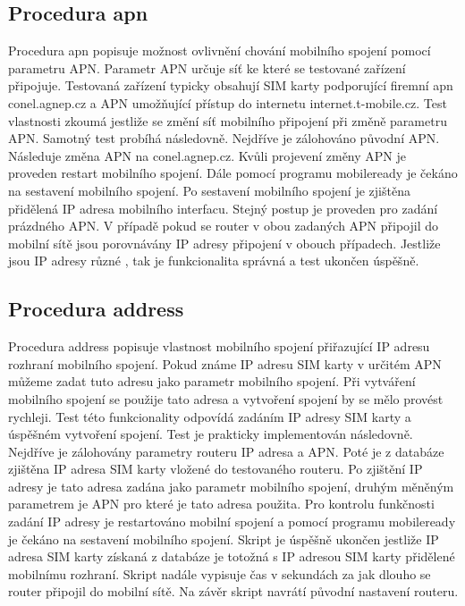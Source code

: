 \subsection{Procedura apn}
Procedura apn popisuje možnost ovlivnění chování mobilního spojení pomocí parametru APN. Parametr APN určuje síť ke které se testované zařízení připojuje. Testovaná zařízení typicky obsahují SIM karty podporující firemní apn conel.agnep.cz a APN umožňující přístup do internetu internet.t-mobile.cz. Test vlastnosti zkoumá jestliže se změní síť mobilního připojení při změně parametru APN. Samotný test probíhá následovně. Nejdříve je zálohováno původní APN. Následuje změna APN na conel.agnep.cz. Kvůli projevení změny APN je proveden restart mobilního spojení. Dále pomocí programu mobileready je čekáno na sestavení mobilního spojení. Po sestavení mobilního spojení je zjištěna přidělená IP adresa mobilního interfacu. Stejný postup je proveden pro zadání prázdného APN. V případě pokud se router v obou zadaných APN připojil do mobilní sítě jsou porovnávány IP adresy připojení v obouch případech. Jestliže jsou IP adresy různé , tak je funkcionalita správná a test ukončen úspěšně.

\subsection{Procedura address}
Procedura address popisuje vlastnost mobilního spojení přiřazující IP adresu rozhraní mobilního spojení. Pokud známe IP adresu SIM karty v určitém APN můžeme zadat tuto adresu jako parametr mobilního spojení. Při vytváření mobilního spojení se použije tato adresa a vytvoření spojení by se mělo provést rychleji. Test této funkcionality odpovídá zadáním IP adresy SIM karty a úspěšném vytvoření spojení. Test je prakticky implementován následovně. Nejdříve je zálohovány parametry routeru IP adresa a APN. Poté je z databáze zjištěna IP adresa SIM karty vložené do testovaného routeru. Po zjištění IP adresy je tato adresa zadána jako parametr mobilního spojení, druhým měněným parametrem je APN pro které je tato adresa použita. Pro kontrolu funkčnosti zadání IP adresy je restartováno mobilní spojení a pomocí programu mobileready je čekáno na sestavení mobilního spojení. Skript je úspěšně ukončen jestliže IP adresa SIM karty získaná z databáze je totožná s IP adresou SIM karty přidělené mobilnímu rozhraní. Skript nadále vypisuje čas v sekundách za jak dlouho se router připojil do mobilní sítě. Na závěr skript navrátí původní nastavení routeru.

